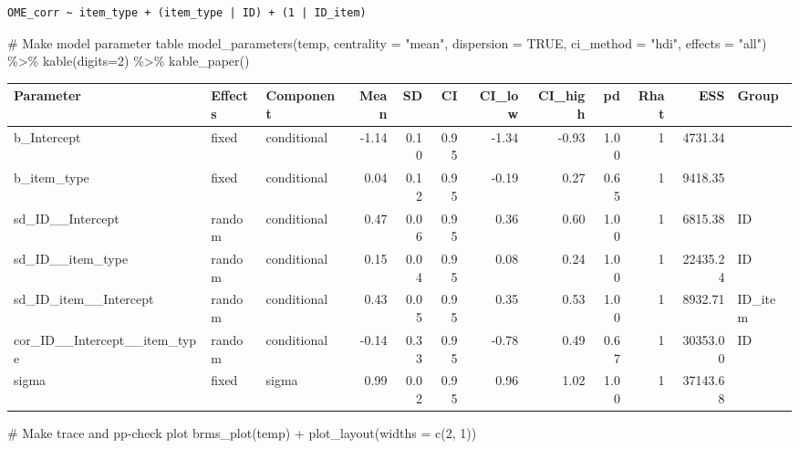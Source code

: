 \documentclass[
  letterpaper,
  DIV=11,
  numbers=noendperiod]{scrartcl}
\newenvironment{Shaded}{\begin{snugshade}}{\end{snugshade}}
\newcommand{\AttributeTok}[1]{\textcolor[rgb]{0.40,0.45,0.13}{#1}}
\newcommand{\CommentTok}[1]{\textcolor[rgb]{0.37,0.37,0.37}{#1}}
\newcommand{\ConstantTok}[1]{\textcolor[rgb]{0.56,0.35,0.01}{#1}}
\newcommand{\DecValTok}[1]{\textcolor[rgb]{0.68,0.00,0.00}{#1}}
\newcommand{\FunctionTok}[1]{\textcolor[rgb]{0.28,0.35,0.67}{#1}}
\newcommand{\NormalTok}[1]{\textcolor[rgb]{0.00,0.23,0.31}{#1}}
\newcommand{\SpecialCharTok}[1]{\textcolor[rgb]{0.37,0.37,0.37}{#1}}
\newcommand{\StringTok}[1]{\textcolor[rgb]{0.13,0.47,0.30}{#1}}
\begin{document}
\begin{verbatim}
OME_corr ~ item_type + (item_type | ID) + (1 | ID_item) 
\end{verbatim}

\begin{Shaded}
\begin{Highlighting}[]
\CommentTok{\# Make model parameter table}
\FunctionTok{model\_parameters}\NormalTok{(temp, }\AttributeTok{centrality =} \StringTok{"mean"}\NormalTok{, }\AttributeTok{dispersion =} \ConstantTok{TRUE}\NormalTok{, }
                 \AttributeTok{ci\_method =} \StringTok{"hdi"}\NormalTok{, }\AttributeTok{effects =} \StringTok{"all"}\NormalTok{) }\SpecialCharTok{\%\textgreater{}\%} 
  \FunctionTok{kable}\NormalTok{(}\AttributeTok{digits=}\DecValTok{2}\NormalTok{) }\SpecialCharTok{\%\textgreater{}\%} \FunctionTok{kable\_paper}\NormalTok{()}
\end{Highlighting}
\end{Shaded}

\begin{longtable*}[t]{lllrrrrrrrrl}
\toprule
Parameter & Effects & Component & Mean & SD & CI & CI\_low & CI\_high & pd & Rhat & ESS & Group\\
\midrule
b\_Intercept & fixed & conditional & -1.14 & 0.10 & 0.95 & -1.34 & -0.93 & 1.00 & 1 & 4731.34 & \\
b\_item\_type & fixed & conditional & 0.04 & 0.12 & 0.95 & -0.19 & 0.27 & 0.65 & 1 & 9418.35 & \\
sd\_ID\_\_Intercept & random & conditional & 0.47 & 0.06 & 0.95 & 0.36 & 0.60 & 1.00 & 1 & 6815.38 & ID\\
sd\_ID\_\_item\_type & random & conditional & 0.15 & 0.04 & 0.95 & 0.08 & 0.24 & 1.00 & 1 & 22435.24 & ID\\
sd\_ID\_item\_\_Intercept & random & conditional & 0.43 & 0.05 & 0.95 & 0.35 & 0.53 & 1.00 & 1 & 8932.71 & ID\_item\\
\addlinespace
cor\_ID\_\_Intercept\_\_item\_type & random & conditional & -0.14 & 0.33 & 0.95 & -0.78 & 0.49 & 0.67 & 1 & 30353.00 & ID\\
sigma & fixed & sigma & 0.99 & 0.02 & 0.95 & 0.96 & 1.02 & 1.00 & 1 & 37143.68 & \\
\bottomrule
\end{longtable*}

\begin{Shaded}
\begin{Highlighting}[]
\CommentTok{\# Make trace and pp{-}check plot}
\FunctionTok{brms\_plot}\NormalTok{(temp)  }\SpecialCharTok{+} \FunctionTok{plot\_layout}\NormalTok{(}\AttributeTok{widths =} \FunctionTok{c}\NormalTok{(}\DecValTok{2}\NormalTok{, }\DecValTok{1}\NormalTok{))}
\end{Highlighting}
\end{Shaded}
\end{document}
